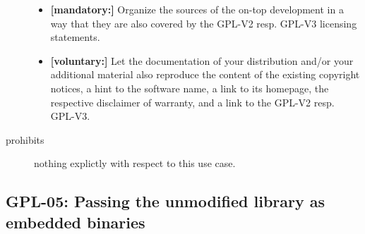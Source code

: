 \begin{description}
\begin{itemize}
 \item \textbf{[mandatory:]} Organize the sources of the on-top development in
  a way that they are also covered by the GPL-V2 resp. GPL-V3 licensing
  statements. 

  \item \textbf{[voluntary:]} Let the documentation of your distribution and/or
  your additional material also reproduce the content of the existing
  copyright notices, a hint to the software name, a link to its homepage,
  the respective disclaimer of warranty, and a link to the GPL-V2 resp.
  GPL-V3.

\end{itemize}

\item[prohibits] nothing explictly with respect to this use case.

\end{description}


\subsection{GPL-05: Passing the unmodified library as embedded binaries} 
\label{OSUC-07B-GPL} 

